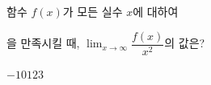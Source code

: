 함수 $f(x)$가 모든 실수 $x$에 대하여 \par\smallskip{}\par\smallskip\noindent 을 만족시킬 때, $\displaystyle\lim_{x\to\infty}\dfrac{f(x)}{x^2}$의 값은?
\begin{choices32}{$-1$}{$0$}{$1$}{$2$}{$3$}\end{choices32}
